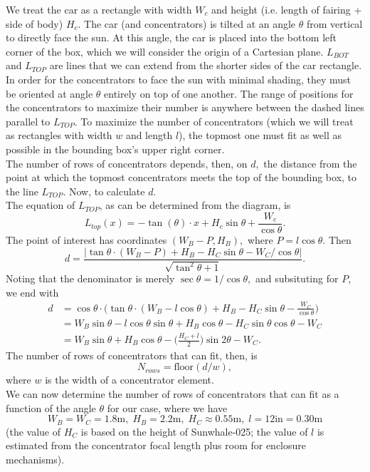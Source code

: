 \documentclass[reqno, 11pt, final]{article}
\begin{document}
We treat the car as a rectangle with width $W_c$ and height (i.e. length of fairing + side of body) $H_c$. The car (and concentrators) is tilted at an angle $\theta$ from vertical to directly face the sun. At this angle, the car is placed into the bottom left corner of the box, which we will consider the origin of a Cartesian plane. $L_{BOT}$ and $L_{TOP}$ are lines that we can extend from the shorter sides of the car rectangle. \\

In order for the concentrators to face the sun with minimal shading, they must be oriented at angle $\theta$ entirely on top of one another. The range of positions for the concentrators to maximize their number is anywhere between the dashed lines parallel to $L_{TOP}$. To maximize the number of concentrators (which we will treat as rectangles with width $w$ and length $l$), the topmost one must fit as well as possible in the bounding box's upper right corner. \\ 

The number of rows of concentrators depends, then, on $d,$ the distance from the point at which the topmost concentrators meets the top of the bounding box, to the line $L_{TOP}.$ Now, to calculate $d$. \\

The equation of $L_{TOP}$, as can be determined from the diagram, is
	\[ L_{top}(x) = -\tan(\theta) \cdot x + H_c \sin \theta + \frac{W_c}{\cos \theta}. \]
The point of interest has coordinates $(W_B - P, H_B),$ where $P = l \cos \theta.$ Then
	\[ d = \frac{\big| \tan\theta \cdot (W_B-P) + H_B - H_C \sin \theta - W_C / \cos \theta \big|}{\sqrt{\tan^2 \theta + 1}}. \]
Noting that the denominator is merely $\sec\theta = 1/\cos\theta,$ and subsituting for $P$, we end with
	\begin{align*} d
		& = \cos\theta \cdot \Big( \tan\theta \cdot (W_B-l\cos\theta) + H_B - H_C \sin \theta - \frac{W_C}{\cos \theta} \Big) \\
		& = W_B\sin\theta - l\cos\theta\sin\theta + H_B\cos\theta - H_C\sin\theta\cos\theta - W_C \\
		& = W_B\sin\theta + H_B\cos\theta - \big(\frac{H_C+l}{2}\big) \sin2\theta - W_C. \end{align*}
The number of rows of concentrators that can fit, then, is
	\[ N_{rows} = \text{floor}(d/w), \]
where $w$ is the width of a concentrator element. \\

We can now determine the number of rows of concentrators that can fit as a function of the angle $\theta$ for our case, where we have
	\[ W_B = W_C = 1.8 \text{m}, \; H_B = 2.2 \text{m}, \; H_C \approx 0.55 \text{m}, \; l = 12 \text{in} = 0.30 \text{m} \]
(the value of $H_C$ is based on the height of Sunwhale-025; the value of $l$ is estimated from the concentrator focal length plus room for enclosure mechanisms). \\
\end{document}
